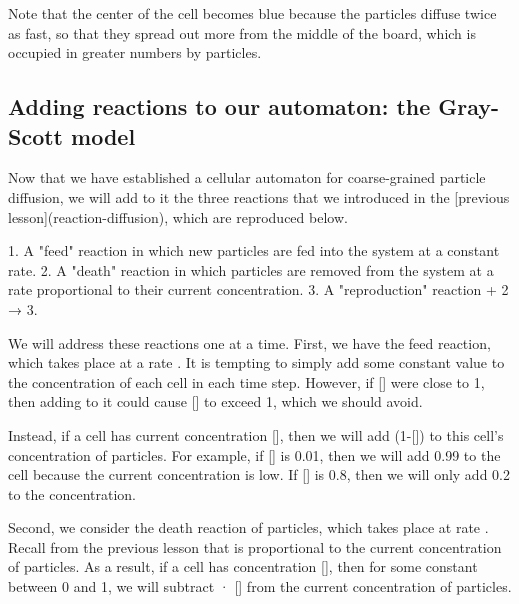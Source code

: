 {{Note that the center of the cell becomes blue because the  particles diffuse twice as fast, so that they spread out more from the middle of the board, which is occupied in greater numbers by  particles.

\FloatBarrier
{}
\subsection{Adding reactions to our automaton: the Gray-Scott model}

Now that we have established a cellular automaton for coarse-grained particle diffusion, we will add to it the three reactions that we introduced in the [previous lesson](reaction-diffusion), which are reproduced below.

1. A "feed" reaction in which new  particles are fed into the system at a constant rate.
2. A "death" reaction in which  particles are removed from the system at a rate proportional to their current concentration.
3. A "reproduction" reaction  + 2 → 3.

\begin{qbox}\end{qbox}

We will address these reactions one at a time. First, we have the feed reaction, which takes place at a rate . It is tempting to simply add some constant value  to the concentration of each cell in each time step. However, if [] were close to 1, then adding  to it could cause [] to exceed 1, which we should avoid.

Instead, if a cell has current concentration [], then we will add (1-[]) to this cell's concentration of  particles. For example, if [] is 0.01, then we will add 0.99 to the cell because the current concentration is low. If [] is 0.8, then we will only add 0.2 to the concentration.

Second, we consider the death reaction of  particles, which takes place at rate . Recall from the previous lesson that  is proportional to the current concentration of  particles. As a result, if a cell has concentration [], then for some constant  between 0 and 1, we will subtract  · [] from the current concentration of  particles.

}}
